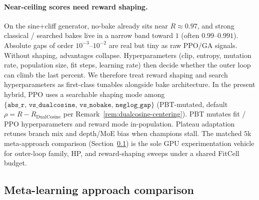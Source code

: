 \paragraph{Near-ceiling scores need reward shaping.}
\label{sec:reward-shaping}
On the sine{+}cliff generator, no-bake already sits near $R\approx 0.97$, and strong classical / searched bakes live in a narrow band toward $1$ (often $0.99$--$0.991$).
Absolute gaps of order $10^{-3}$--$10^{-2}$ are real but tiny as raw PPO/GA signals.
Without shaping, advantages collapse.
Hyperparameters (clip, entropy, mutation rate, population size, fit steps, learning rate) then decide whether the outer loop can climb the last percent.
We therefore treat reward shaping and search hyperparameters as first-class tunables alongside bake architecture.
In the present hybrid, PPO uses a searchable shaping mode among $\{\texttt{abs\_r},\,\texttt{vs\_dualcosine},\,\texttt{vs\_nobake},\,\texttt{neglog\_gap}\}$ (PBT-mutated, default $\rho = R - R_{\mathrm{DualCosine}}$ per Remark~\ref{rem:dualcosine-centering}).
PBT mutates fit / PPO hyperparameters and reward mode in-population. Plateau adaptation retunes branch mix and depth/MoE bias when champions stall.
The matched $5$k meta-approach comparison (Section~\ref{sec:meta-compare}) is the sole GPU experimentation vehicle for outer-loop family, HP, and reward-shaping sweeps under a shared FitCell budget.

\subsection{Meta-learning approach comparison}
\label{sec:meta-compare}

